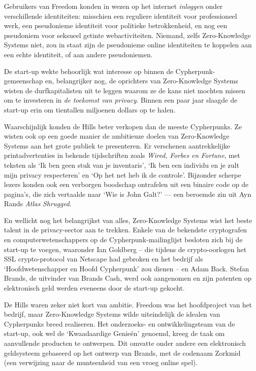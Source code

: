 \documentclass[
  a5paper,
  smalldemyvopaper,11pt,twoside,onecolumn,openright,extrafontsizes,
hidelinks]{memoir}
\begin{document}
Gebruikers van Freedom konden in wezen op het internet \emph{inloggen}
onder verschillende identiteiten: misschien een reguliere identiteit
voor professioneel werk, een pseudonieme identiteit voor politieke
betrokkenheid, en nog een pseudoniem voor seksueel getinte
webactiviteiten. Niemand, zelfs Zero-Knowledge Systems niet, zou in
staat zijn de pseudonieme online identiteiten te koppelen aan een echte
identiteit, of aan andere pseudoniemen.

De start-up wekte behoorlijk wat interesse op binnen de
Cypherpunk-gemeenschap en, belangrijker nog, de oprichters van
Zero-Knowledge Systems wisten de durfkapitalisten uit te leggen waarom
ze de kans niet mochten missen om te investeren in \emph{de toekomst van
privacy}. Binnen een paar jaar slaagde de start-up erin om tientallen
miljoenen dollars op te halen.

Waarschijnlijk konden de Hills beter verkopen dan de meeste Cypherpunks.
Ze wisten ook op een goede manier de ambitieuze doelen van
Zero-Knowledge Systems aan het grote publiek te presenteren. Er
verschenen aantrekkelijke printadvertenties in bekende tijdschriften
zoals \emph{Wired, Forbes en Fortune}, met teksten als `Ik ben geen stuk
van je inventaris', `Ik ben een individu en je zult mijn privacy
respecteren' en `Op het net heb ik de controle'. Bijzonder scherpe
lezers konden ook een verborgen boodschap ontrafelen uit een binaire
code op de pagina's, die zich vertaalde naar `Wie is John Galt?' --- een
beroemde zin uit Ayn Rands \emph{Atlas Shrugged}.

En wellicht nog het belangrijkst van alles, Zero-Knowledge Systems wist
het beste talent in de privacy-sector aan te trekken. Enkele van de
bekendste cryptografen en computerwetenschappers op de
Cypherpunk-mailinglijst besloten zich bij de start-up te voegen,
waaronder Ian Goldberg -- die tijdens de crypto-oorlogen het SSL
crypto-protocol van Netscape had gebroken en het bedrijf als
`Hoofdwetenschapper en Hoofd Cypherpunk' zou dienen -- en Adam Back.
Stefan Brands, de uitvinder van Brands Cash, werd ook aangenomen en zijn
patenten op elektronisch geld werden eveneens door de start-up gekocht.

De Hills waren zeker niet kort van ambitie. Freedom was het hoofdproject
van het bedrijf, maar Zero-Knowledge Systems wilde uiteindelijk de
idealen van Cypherpunks breed realiseren. Het onderzoeks- en
ontwikkelingsteam van de start-up, ook wel de `Kwaadaardige Genieën'
genoemd, kreeg de taak om aanvullende producten te ontwerpen. Dit
omvatte onder andere een elektronisch geldsysteem gebaseerd op het
ontwerp van Brands, met de codenaam Zorkmid (een verwijzing naar de
munteenheid van een vroeg online spel).
\end{document}
